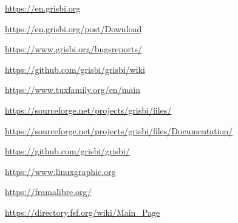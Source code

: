 

\urldef{\urlGrisbi}%
\url{https://en.grisbi.org}

\urldef{\urlGrisbiTelechargement}%
\url{https://en.grisbi.org/post/Download}

\urldef{\urlBugTracker}%
\url{https://www.grisbi.org/bugsreports/}

\urldef{\urlGrisbiWiki}%
\url{https://github.com/grisbi/grisbi/wiki}

\urldef{\urlTuxFamily}%
\url{https://www.tuxfamily.org/en/main}

\urldef{\urlSourceForge}%
\url{https://sourceforge.net/projects/grisbi/files/}

\urldef{\urlSourceForgeDocumentation}%
\url{https://sourceforge.net/projects/grisbi/files/Documentation/}

\urldef{\urlGitHubGrisbi}%
\url{https://github.com/grisbi/grisbi/}

\urldef{\urlLinuxGraphic}%
\url{https://www.linuxgraphic.org}

\urldef{\urlFramasoftLogiciels}%
\url{https://framalibre.org/}

\urldef{\urlFreeSoftwareDirectory}%
\url{https://directory.fsf.org/wiki/Main_Page}






